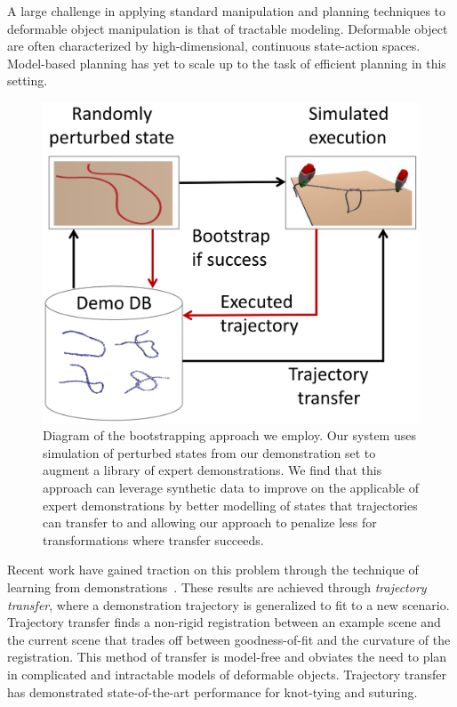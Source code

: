 A large challenge in applying standard manipulation and planning techniques to
deformable object manipulation is that of tractable modeling. Deformable object 
are often characterized by high-dimensional, continuous state-action spaces. Model-based 
planning has yet to scale up to the task of efficient planning in this
setting.

\begin{figure}[t]
  \includegraphics[width=\linewidth]{figs/teaser.png}
  \caption{Diagram of the bootstrapping approach we employ. Our system uses simulation
           of perturbed states from our demonstration set to augment a library of expert
           demonstrations. We find that this approach can leverage synthetic data to improve
           on the applicable of expert demonstrations by better modelling of states that
           trajectories can transfer to and allowing our approach to penalize less for
           transformations where transfer succeeds.}
  \label{fig:bootstrap}
\end{figure}

Recent work have gained traction on this problem through the technique of 
learning from demonstrations~\cite{Schulmanetal_ISRR2013,Schulmanetal_IROS2013}.
These results are achieved through \emph{trajectory transfer}, where a demonstration
trajectory is generalized to fit to a new scenario. Trajectory transfer finds a non-rigid
registration between an example scene and the current scene that trades off between
goodness-of-fit and the curvature of the registration. 
This method of transfer is model-free and obviates the need to plan in complicated
and intractable models of deformable objects. Trajectory transfer has demonstrated 
state-of-the-art performance for knot-tying and suturing.

